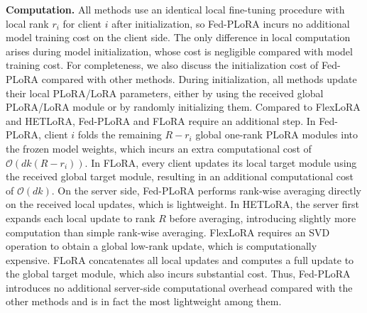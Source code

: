 \documentclass{article} %
\begin{document}
{\textbf{Computation.}
All methods use an identical local fine-tuning procedure with local rank $r_i$ for client $i$ after initialization, so Fed-PLoRA incurs no additional model training cost on the client side. The only difference in local computation arises during model initialization, whose cost is negligible compared with model training cost. For completeness, we also discuss the initialization cost of Fed-PLoRA compared with other methods. 
During initialization, all methods update their local PLoRA/LoRA parameters, either by using the received global PLoRA/LoRA module or by randomly initializing them. Compared to FlexLoRA and HETLoRA, Fed-PLoRA and FLoRA require an additional step. 
In Fed-PLoRA, client $i$ folds the remaining $R-r_i$ global one-rank PLoRA modules into the frozen model weights, which incurs an extra computational cost of $\mathcal{O}(dk (R-r_i))$. In FLoRA, every client updates its local target module using the received global target module, resulting in an additional computational cost of $\mathcal{O}(dk)$. 
On the server side, Fed-PLoRA performs rank-wise averaging directly on the received local updates, which is lightweight. In HETLoRA, the server first expands each local update to rank $R$ before averaging, introducing slightly more computation than simple rank-wise averaging. FlexLoRA requires an SVD operation to obtain a global low-rank update, which is computationally expensive. FLoRA concatenates all local updates and computes a full update to the global target module, which also incurs substantial cost. Thus, Fed-PLoRA introduces no additional server-side computational overhead compared with the other methods and is in fact the most lightweight among them. 
%



}
\end{document}
